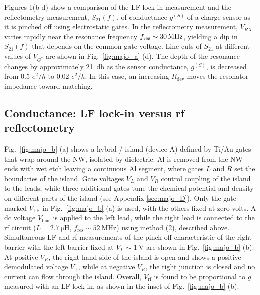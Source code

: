 Figures 1(b-d) show a comparison of the LF lock-in measurement and the reflectometry measurement, $S_{21}(f)$, of conductance $g^{(S)}$ of a charge sensor as it is pinched off using electrostatic gates.  In the reflectometry measurement, $V_{RX}$ varies rapidly near the resonance frequency $f_{\rm res} \sim \SI{30}{\mega\hertz}$, yielding a dip in $S_{21}(f)$ that depends on the common gate voltage.  Line cuts of $S_{21}$ at different values of $V_{G^{*}}$ are shown in Fig.~\ref{fig:majo_a} (d).
The depth of the resonance changes by approximately \SI{21}{\decibel} as the sensor conductance, $g^{(S)}$, is decreased from 0.5 $e^{2}/h$ to 0.02 $e^{2}/h$. In this case, an increasing $R_\textrm{dev}$ moves the resonator impedance toward matching.

\subsection{Conductance: LF lock-in versus rf reflectometry}

Fig.~\ref{fig:majo_b} (a) shows a hybrid / island (device A) defined by Ti/Au gates that wrap around the NW, isolated by  dielectric. Al is removed from the NW ends with wet etch leaving a continuous Al segment, where gates $L$ and $R$ set the boundaries of the island. Gate voltages $V_{L}$ and $V_{R}$ control coupling of the island to the leads, while three additional gates tune the chemical potential and density on different parts of the island (see Appendix \ref{sec:majo_D}). Only the gate marked $V_{\textrm{LP}}$ in Fig.~\ref{fig:majo_b} (a) is used, with the others fixed at zero volts. A dc voltage $V_\textrm{bias}$ is applied to the left lead, while the right lead is connected to the rf circuit ($L = \SI{2.7}{\micro\henry}$, $f_\textrm{res} \sim \SI{52}{\mega\hertz}$) using method (2), described above. Simultaneous LF and rf measurements of the pinch-off characteristic of the right barrier with the left barrier fixed at $V_{L} \sim \SI{1}{\volt}$ are shown in Fig.~\ref{fig:majo_b} (b). At positive $V_{R}$, the right-hand side of the island is open and shows a positive demodulated voltage $V_\textrm{rf}$, while at negative $V_{R}$, the right junction is closed and no current can flow through the island. Overall, $V_\textrm{rf}$ is found to be proportional to $g$ measured with an LF lock-in, as shown in the inset of Fig.~\ref{fig:majo_b} (b).

